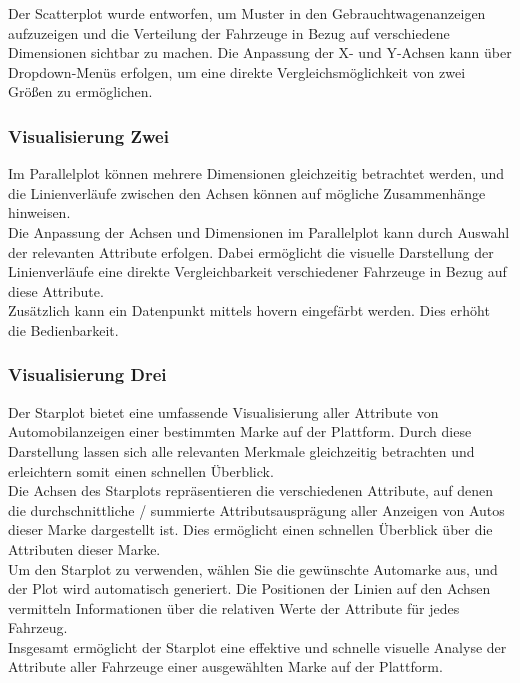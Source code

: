 Der Scatterplot wurde entworfen, um Muster in den Gebrauchtwagenanzeigen aufzuzeigen und die Verteilung der Fahrzeuge in Bezug auf verschiedene Dimensionen sichtbar zu machen. Die Anpassung der X- und Y-Achsen kann über Dropdown-Menüs erfolgen, um eine direkte Vergleichsmöglichkeit von zwei Größen zu ermöglichen.\\
\subsubsection{Visualisierung Zwei}

Im Parallelplot können mehrere Dimensionen gleichzeitig betrachtet werden, und die Linienverläufe zwischen den Achsen können auf mögliche Zusammenhänge hinweisen. \\
Die Anpassung der Achsen und Dimensionen im Parallelplot kann durch Auswahl der relevanten Attribute erfolgen. Dabei ermöglicht die visuelle Darstellung der Linienverläufe eine direkte Vergleichbarkeit verschiedener Fahrzeuge in Bezug auf diese Attribute. \\
Zusätzlich kann ein Datenpunkt mittels hovern eingefärbt werden. Dies erhöht die Bedienbarkeit. \\
\subsubsection{Visualisierung Drei}

Der Starplot bietet eine umfassende Visualisierung aller Attribute von Automobilanzeigen einer bestimmten Marke auf der Plattform. Durch diese Darstellung lassen sich alle relevanten Merkmale gleichzeitig betrachten und erleichtern somit einen schnellen Überblick. \\
Die Achsen des Starplots repräsentieren die verschiedenen Attribute, auf denen die durchschnittliche / summierte Attributsausprägung aller Anzeigen von Autos dieser Marke dargestellt ist. Dies ermöglicht einen schnellen Überblick über die Attributen dieser Marke. \\
Um den Starplot zu verwenden, wählen Sie die gewünschte Automarke aus, und der Plot wird automatisch generiert. Die Positionen der Linien auf den Achsen vermitteln Informationen über die relativen Werte der Attribute für jedes Fahrzeug. \\
Insgesamt ermöglicht der Starplot eine effektive und schnelle visuelle Analyse der Attribute aller Fahrzeuge einer ausgewählten Marke auf der Plattform. \\

